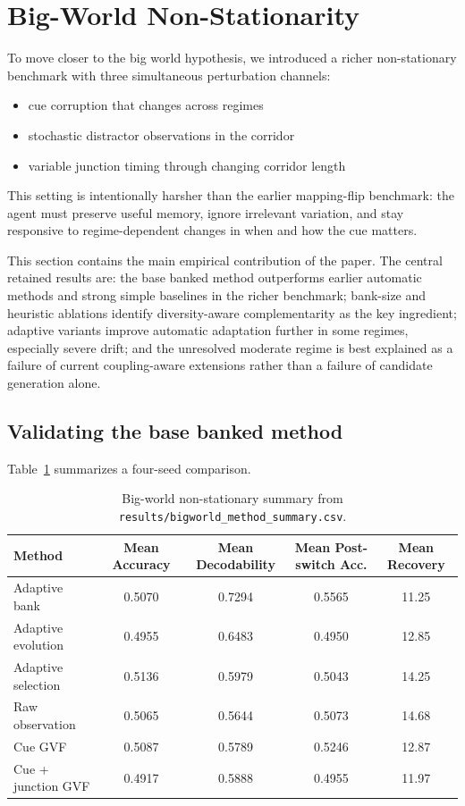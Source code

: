 \documentclass[11pt]{article}
\begin{document}
\section{Big-World Non-Stationarity}
To move closer to the big world hypothesis, we introduced a richer non-stationary benchmark with three simultaneous perturbation channels:
\begin{itemize}
    \item cue corruption that changes across regimes
    \item stochastic distractor observations in the corridor
    \item variable junction timing through changing corridor length
\end{itemize}

This setting is intentionally harsher than the earlier mapping-flip benchmark: the agent must preserve useful memory, ignore irrelevant variation, and stay responsive to regime-dependent changes in when and how the cue matters.

This section contains the main empirical contribution of the paper. The central retained results are:
the base banked method outperforms earlier automatic methods and strong simple baselines in the richer benchmark; bank-size and heuristic ablations identify diversity-aware complementarity as the key ingredient; adaptive variants improve automatic adaptation further in some regimes, especially severe drift; and the unresolved moderate regime is best explained as a failure of current coupling-aware extensions rather than a failure of candidate generation alone.

\subsection{Validating the base banked method}
Table~\ref{tab:bigworld} summarizes a four-seed comparison.

\begin{table}[h]
\centering
\begin{tabular}{lcccc}
\toprule
Method & Mean Accuracy & Mean Decodability & Mean Post-switch Acc. & Mean Recovery \\
\midrule
Adaptive bank & 0.5070 & 0.7294 & 0.5565 & 11.25 \\
Adaptive evolution & 0.4955 & 0.6483 & 0.4950 & 12.85 \\
Adaptive selection & 0.5136 & 0.5979 & 0.5043 & 14.25 \\
Raw observation & 0.5065 & 0.5644 & 0.5073 & 14.68 \\
Cue GVF & 0.5087 & 0.5789 & 0.5246 & 12.87 \\
Cue + junction GVF & 0.4917 & 0.5888 & 0.4955 & 11.97 \\
\bottomrule
\end{tabular}
\caption{Big-world non-stationary summary from \texttt{results/bigworld\_method\_summary.csv}.}
\label{tab:bigworld}
\end{table}
\end{document}
